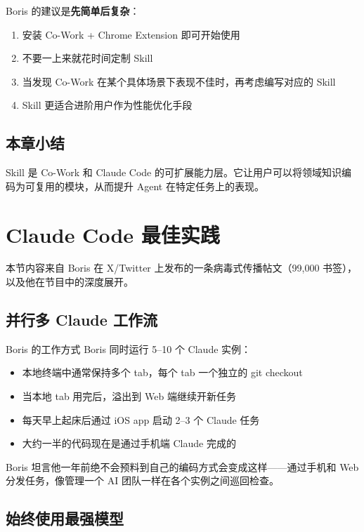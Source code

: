 \documentclass[a4paper]{article}
\begin{document}
Boris 的建议是\textbf{先简单后复杂}：

\begin{enumerate}
    \item 安装 Co-Work + Chrome Extension 即可开始使用
    \item 不要一上来就花时间定制 Skill
    \item 当发现 Co-Work 在某个具体场景下表现不佳时，再考虑编写对应的 Skill
    \item Skill 更适合进阶用户作为性能优化手段
\end{enumerate}

\subsection{本章小结}

Skill 是 Co-Work 和 Claude Code 的可扩展能力层。它让用户可以将领域知识编码为可复用的模块，从而提升 Agent 在特定任务上的表现。

\section{Claude Code 最佳实践}

本节内容来自 Boris 在 X/Twitter 上发布的一条病毒式传播帖文（99,000 书签），以及他在节目中的深度展开。

\subsection{并行多 Claude 工作流}

\begin{importantbox}{Boris 的工作方式}
Boris 同时运行 5--10 个 Claude 实例：
\begin{itemize}
    \item 本地终端中通常保持多个 tab，每个 tab 一个独立的 git checkout
    \item 当本地 tab 用完后，溢出到 Web 端继续开新任务
    \item 每天早上起床后通过 iOS app 启动 2--3 个 Claude 任务
    \item 大约一半的代码现在是通过手机端 Claude 完成的
\end{itemize}
\end{importantbox}

Boris 坦言他一年前绝不会预料到自己的编码方式会变成这样——通过手机和 Web 分发任务，像管理一个 AI 团队一样在各个实例之间巡回检查。

\subsection{始终使用最强模型}
\end{document}
